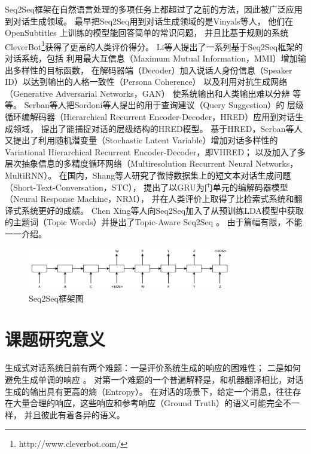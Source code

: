 Seq2Seq框架在自然语言处理的多项任务上都超过了之前的方法，因此被广泛应用到对话生成领域。
最早把Seq2Seq用到对话生成领域的是Vinyals等人，
他们在OpenSubtitles
上训练的模型能回答简单的常识问题，
并且比基于规则的系统CleverBot\footnote{http://www.cleverbot.com/}获得了更高的人类评价得分。
Li等人提出了一系列基于Seq2Seq框架的对话系统，包括
利用最大互信息（Maximum Mutual Information，MMI）增加输出多样性的目标函数，
在解码器端（Decoder）加入说话人身份信息（Speaker ID）以达到输出的人格一致性（Persona Coherence）
以及利用对抗生成网络（Generative Adversarial Networks，GAN）
使系统输出和人类输出难以分辨 等等。
Serban等人把Sordoni等人提出的用于查询建议（Query Suggestion）的
层级循环编解码器（Hierarchical Recurrent Encoder-Decoder，HRED）应用到对话生成领域，
提出了能捕捉对话的层级结构的HRED模型。
基于HRED，Serban等人又提出了利用随机潜变量（Stochastic Latent Variable）增加对话多样性的Variational Hierarchical Recurrent Encoder-Decoder，即VHRED；
以及加入了多层次抽象信息的多精度循环网络（Multiresolution Recurrent Neural Networks，MultiRNN）。
在国内，Shang等人研究了微博数据集上的短文本对话生成问题（Short-Text-Conversation，STC），
提出了以GRU为门单元的编解码器模型（Neural Response Machine，NRM），
并在人类评价上取得了比检索式系统和翻译式系统更好的成绩。
Chen Xing等人向Seq2Seq加入了从预训练LDA模型中获取的主题词（Topic Words）并提出了Topic-Aware Seq2Seq 。
由于篇幅有限，不能一一介绍。

\begin{figure}[H]
    \centering
    \includegraphics[width=0.8\textwidth]{figure/Seq2Seq.png}
    \caption{Seq2Seq框架图}
    \label{fig:Seq2Seq}
\end{figure}

\section{课题研究意义}\label{sec:research_meaning}
生成式对话系统目前有两个难题：一是评价系统生成的响应的困难性；
二是如何避免生成单调的响应
。
对第一个难题的一个普遍解释是，和机器翻译相比，对话生成的输出具有更高的熵（Entropy）。
在对话的场景下，给定一个消息，往往存在大量合理的响应，这些响应和参考响应（Ground Truth）的语义可能完全不一样，
并且彼此有着各异的语义。

